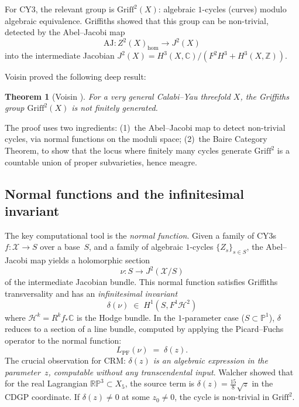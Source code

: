 \documentclass[11pt]{article}
\theoremstyle{plain}
\newtheorem{theorem}{Theorem}[section]
\theoremstyle{definition}
\theoremstyle{remark}
\newcommand{\Z}{\mathbb{Z}}
\newcommand{\R}{\mathbb{R}}
\newcommand{\C}{\mathbb{C}}
\newcommand{\PP}{\mathbb{P}}
\newcommand{\Griff}{\mathrm{Griff}}
\newcommand{\AJ}{\mathrm{AJ}}
\begin{document}
For CY3, the relevant group is $\Griff^2(X)$: algebraic $1$-cycles (curves) modulo algebraic equivalence. Griffiths \cite{griffiths1969} showed that this group can be non-trivial, detected by the Abel--Jacobi map
\[
\AJ: Z^2(X)_{\mathrm{hom}} \longrightarrow J^2(X)
\]
into the intermediate Jacobian $J^2(X) = H^3(X,\C)/(F^2 H^3 + H^3(X,\Z))$.

Voisin proved the following deep result:

\begin{theorem}[Voisin {\cite{voisin2002,voisin-hodge-II}}]
For a very general Calabi--Yau threefold $X$, the Griffiths group $\Griff^2(X)$ is not finitely generated.
\end{theorem}

The proof uses two ingredients: (1)~the Abel--Jacobi map to detect non-trivial cycles, via normal functions on the moduli space; (2)~the Baire Category Theorem, to show that the locus where finitely many cycles generate $\Griff^2$ is a countable union of proper subvarieties, hence meagre.

\subsection{Normal functions and the infinitesimal invariant}

The key computational tool is the \emph{normal function}. Given a family of CY3s $f: \mathcal{X} \to S$ over a base~$S$, and a family of algebraic $1$-cycles $\{Z_s\}_{s \in S}$, the Abel--Jacobi map yields a holomorphic section
\[
\nu: S \longrightarrow J^2(\mathcal{X}/S)
\]
of the intermediate Jacobian bundle. This normal function satisfies Griffiths transversality and has an \emph{infinitesimal invariant}
\[
\delta(\nu) \;\in\; H^1(S, F^1 \mathcal{H}^2)
\]
where $\mathcal{H}^k = R^k f_* \C$ is the Hodge bundle. In the $1$-parameter case ($S \subset \PP^1$), $\delta$ reduces to a section of a line bundle, computed by applying the Picard--Fuchs operator to the normal function:
\begin{equation}\label{eq:inhomogeneous-pf}
L_{\mathrm{PF}}(\nu) \;=\; \delta(z).
\end{equation}
The crucial observation for CRM: \emph{$\delta(z)$ is an algebraic expression in the parameter~$z$, computable without any transcendental input}. Walcher \cite{walcher} showed that for the real Lagrangian $\R\PP^3 \subset X_5$, the source term is $\delta(z) = \tfrac{15}{8}\sqrt{z}$ in the CDGP coordinate. If $\delta(z) \neq 0$ at some $z_0 \neq 0$, the cycle is non-trivial in $\Griff^2$.
\end{document}
